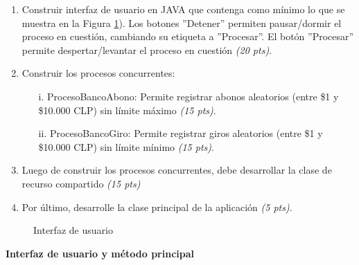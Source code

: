 \documentclass[10pt]{article}
\begin{document}
\begin{enumerate}
    \begin{enumerate}[label=(\alph*)]
		\item Construir interfaz de usuario en JAVA que contenga como m\'inimo lo que se muestra en la Figura \ref{fig:graf-user-mt}). Los botones ''Detener'' permiten pausar/dormir el proceso en cuesti\'on, cambiando su etiqueta a ''Procesar''. El bot\'on ''Procesar'' permite despertar/levantar el proceso en cuesti\'on \emph{(20 pts)}.
		\item Construir los procesos concurrentes:
		\begin{enumerate}[label=(\alph*)]
			\item[i.] ProcesoBancoAbono: Permite registrar abonos aleatorios (entre \$1 y \$10.000 CLP) sin l\'imite m\'aximo \emph{(15 pts)}.
			\item[ii.] ProcesoBancoGiro: Permite registrar giros aleatorios (entre \$1 y \$10.000 CLP) sin l\'imite m\'inimo \emph{(15 pts)}.
		\end{enumerate}
		\item Luego de construir los procesos concurrentes, debe desarrollar la clase de recurso compartido \emph{(15 pts)}
		\item Por \'ultimo, desarrolle la clase principal de la aplicaci\'on \emph{(5 pts)}.
	\end{enumerate}

	\begin{figure}[h]
        \begin{center}
            \caption{Interfaz de usuario}\label{fig:graf-user-mt}
        \end{center}
    \end{figure}
	\end{enumerate}
	\textbf{Interfaz de usuario y m\'etodo principal}
\end{document}
